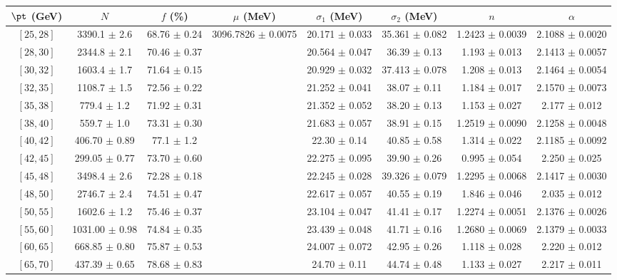 \begin{tabular}{c||c|c|c|c|c|c|c}
$\pt$ (GeV) & $N$ & $f$ (\%) & $\mu$ (MeV) & $\sigma_1$ (MeV) & $\sigma_2$ (MeV) & $n$ & $\alpha$ \\
\hline
$[25, 28]$ & 3390.1 $\pm$ 2.6 & 68.76 $\pm$ 0.24 & \multirow{19}{*}{3096.7826 $\pm$ 0.0075} & 20.171 $\pm$ 0.033 & 35.361 $\pm$ 0.082 & 1.2423 $\pm$ 0.0039 & 2.1088 $\pm$ 0.0020\\
$[28, 30]$ & 2344.8 $\pm$ 2.1 & 70.46 $\pm$ 0.37 &  & 20.564 $\pm$ 0.047 & 36.39 $\pm$ 0.13 & 1.193 $\pm$ 0.013 & 2.1413 $\pm$ 0.0057\\
$[30, 32]$ & 1603.4 $\pm$ 1.7 & 71.64 $\pm$ 0.15 &  & 20.929 $\pm$ 0.032 & 37.413 $\pm$ 0.078 & 1.208 $\pm$ 0.013 & 2.1464 $\pm$ 0.0054\\
$[32, 35]$ & 1108.7 $\pm$ 1.5 & 72.56 $\pm$ 0.22 &  & 21.252 $\pm$ 0.041 & 38.07 $\pm$ 0.11 & 1.184 $\pm$ 0.017 & 2.1570 $\pm$ 0.0073\\
$[35, 38]$ & 779.4 $\pm$ 1.2 & 71.92 $\pm$ 0.31 &  & 21.352 $\pm$ 0.052 & 38.20 $\pm$ 0.13 & 1.153 $\pm$ 0.027 & 2.177 $\pm$ 0.012\\
$[38, 40]$ & 559.7 $\pm$ 1.0 & 73.31 $\pm$ 0.30 &  & 21.683 $\pm$ 0.057 & 38.91 $\pm$ 0.15 & 1.2519 $\pm$ 0.0090 & 2.1258 $\pm$ 0.0048\\
$[40, 42]$ & 406.70 $\pm$ 0.89 & 77.1 $\pm$ 1.2 &  & 22.30 $\pm$ 0.14 & 40.85 $\pm$ 0.58 & 1.314 $\pm$ 0.022 & 2.1185 $\pm$ 0.0092\\
$[42, 45]$ & 299.05 $\pm$ 0.77 & 73.70 $\pm$ 0.60 &  & 22.275 $\pm$ 0.095 & 39.90 $\pm$ 0.26 & 0.995 $\pm$ 0.054 & 2.250 $\pm$ 0.025\\
$[45, 48]$ & 3498.4 $\pm$ 2.6 & 72.28 $\pm$ 0.18 &  & 22.245 $\pm$ 0.028 & 39.326 $\pm$ 0.079 & 1.2295 $\pm$ 0.0068 & 2.1417 $\pm$ 0.0030\\
$[48, 50]$ & 2746.7 $\pm$ 2.4 & 74.51 $\pm$ 0.47 &  & 22.617 $\pm$ 0.057 & 40.55 $\pm$ 0.19 & 1.846 $\pm$ 0.046 & 2.035 $\pm$ 0.012\\
$[50, 55]$ & 1602.6 $\pm$ 1.2 & 75.46 $\pm$ 0.37 &  & 23.104 $\pm$ 0.047 & 41.41 $\pm$ 0.17 & 1.2274 $\pm$ 0.0051 & 2.1376 $\pm$ 0.0026\\
$[55, 60]$ & 1031.00 $\pm$ 0.98 & 74.84 $\pm$ 0.35 &  & 23.439 $\pm$ 0.048 & 41.71 $\pm$ 0.16 & 1.2680 $\pm$ 0.0069 & 2.1379 $\pm$ 0.0033\\
$[60, 65]$ & 668.85 $\pm$ 0.80 & 75.87 $\pm$ 0.53 &  & 24.007 $\pm$ 0.072 & 42.95 $\pm$ 0.26 & 1.118 $\pm$ 0.028 & 2.220 $\pm$ 0.012\\
$[65, 70]$ & 437.39 $\pm$ 0.65 & 78.68 $\pm$ 0.83 &  & 24.70 $\pm$ 0.11 & 44.74 $\pm$ 0.48 & 1.133 $\pm$ 0.027 & 2.217 $\pm$ 0.011\\

\end{tabular}
